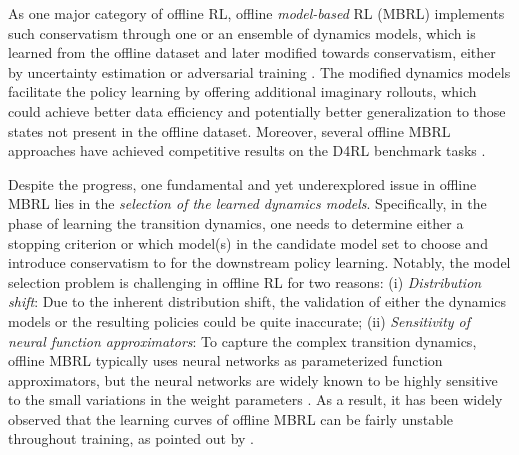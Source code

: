 As one major category of offline RL, offline \textit{model-based} RL (MBRL) implements such conservatism through one or an ensemble of dynamics models, which is learned from the offline dataset and later modified towards conservatism, either by uncertainty estimation \citep{yu2020mopo, kidambi2020morel,yu2021combo,rashidinejad2021bridging,sun2023model} or adversarial training \citep{rigter2022rambo,bhardwaj2023adversarial}. 
The modified dynamics models facilitate the policy learning by offering additional imaginary rollouts, which could achieve better data efficiency and potentially better generalization to those states not present in the offline dataset. Moreover, several offline MBRL approaches \citep{rigter2022rambo,sun2023model,bhardwaj2023adversarial} have achieved competitive results on the D4RL benchmark tasks \citep{fu2020d4rl}.


Despite the progress, one fundamental and yet underexplored issue in offline MBRL lies in the \textit{selection of the learned dynamics models}. Specifically, in the phase of learning the transition dynamics, one needs to determine either a stopping criterion or which model(s) in the candidate model set to choose and introduce conservatism to for the downstream policy learning. Notably, the model selection problem is challenging in offline RL for two reasons: (i) \textit{Distribution shift}: Due to the inherent distribution shift, the validation of either the dynamics models or the resulting policies could be quite inaccurate; (ii) \textit{Sensitivity of neural function approximators}: To capture the complex transition dynamics, offline MBRL typically uses neural networks as parameterized function approximators, but the neural networks are widely known to be highly sensitive to the small variations in the weight parameters \citep{jacot2018neural,tsai2021formalizing, liu2017fault}. 
As a result, it has been widely observed that the learning curves of offline MBRL can be fairly unstable throughout training, as pointed out by \citep{lu2021revisiting}.%
\vspace{-1mm}

